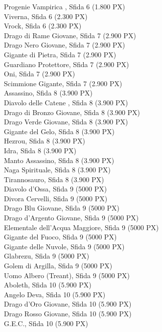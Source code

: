\begin{multicols}{3}
{Progenie Vampirica  , Sfida 6 (1.800 PX)\\
Viverna, Sfida 6 (2.300 PX)\\
Vrock, Sfida 6 (2.300 PX)\\
Drago di Rame Giovane, Sfida 7 (2.900 PX)\\
Drago Nero Giovane, Sfida 7 (2.900 PX)\\
Gigante di Pietra, Sfida 7 (2.900 PX)\\
Guardiano Protettore, Sfida 7 (2.900 PX)\\
Oni, Sfida 7 (2.900 PX)\\
Scimmione Gigante, Sfida 7 (2.900 PX)\\
Assassino, Sfida 8 (3.900 PX)\\
Diavolo delle Catene , Sfida 8 (3.900 PX)\\
Drago di Bronzo Giovane, Sfida 8 (3.900 PX)\\
Drago Verde Giovane, Sfida 8 (3.900 PX)\\
Gigante del Gelo, Sfida 8 (3.900 PX)\\
Hezrou, Sfida 8 (3.900 PX)\\
Idra, Sfida 8 (3.900 PX)\\
Manto Assassino, Sfida 8 (3.900 PX)\\
Naga Spirituale, Sfida 8 (3.900 PX)\\
Tirannosauro, Sfida 8 (3.900 PX)\\
Diavolo d'Ossa, Sfida 9 (5000 PX)\\
Divora Cervelli, Sfida 9 (5000 PX)\\
Drago Blu Giovane, Sfida 9 (5000 PX)\\
Drago d'Argento Giovane, Sfida 9 (5000 PX)\\
Elementale dell'Acqua Maggiore, Sfida 9 (5000 PX)\\
Gigante del Fuoco, Sfida 9 (5000 PX)\\
Gigante delle Nuvole, Sfida 9 (5000 PX)\\
Glabrezu, Sfida 9 (5000 PX)\\
Golem di Argilla, Sfida 9 (5000 PX)\\
Uomo Albero (Treant), Sfida 9 (5000 PX)\\
Aboleth, Sfida 10 (5.900 PX)\\
Angelo Deva, Sfida 10 (5.900 PX)\\
Drago d'Oro Giovane, Sfida 10 (5.900 PX)\\
Drago Rosso Giovane, Sfida 10 (5.900 PX)\\
G.E.C., Sfida 10 (5.900 PX)\\
}
\end{multicols}
